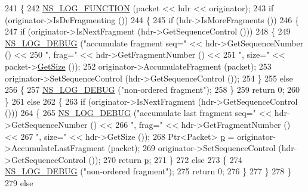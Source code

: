 \begin{DoxyCode}
241 \{
242   \hyperlink{log-macros-disabled_8h_a90b90d5bad1f39cb1b64923ea94c0761}{NS\_LOG\_FUNCTION} (packet << hdr << originator);
243   \textcolor{keywordflow}{if} (originator->IsDeFragmenting ())
244     \{
245       \textcolor{keywordflow}{if} (hdr->IsMoreFragments ())
246         \{
247           \textcolor{keywordflow}{if} (originator->IsNextFragment (hdr->GetSequenceControl ()))
248             \{
249               \hyperlink{group__logging_ga413f1886406d49f59a6a0a89b77b4d0a}{NS\_LOG\_DEBUG} (\textcolor{stringliteral}{"accumulate fragment seq="} << hdr->GetSequenceNumber () <<
250                             \textcolor{stringliteral}{", frag="} << hdr->GetFragmentNumber () <<
251                             \textcolor{stringliteral}{", size="} << packet->\hyperlink{classns3_1_1Packet_a462855c9929954d4301a4edfe55f4f1c}{GetSize} ());
252               originator->AccumulateFragment (packet);
253               originator->SetSequenceControl (hdr->GetSequenceControl ());
254             \}
255           \textcolor{keywordflow}{else}
256             \{
257               \hyperlink{group__logging_ga413f1886406d49f59a6a0a89b77b4d0a}{NS\_LOG\_DEBUG} (\textcolor{stringliteral}{"non-ordered fragment"});
258             \}
259           \textcolor{keywordflow}{return} 0;
260         \}
261       \textcolor{keywordflow}{else}
262         \{
263           \textcolor{keywordflow}{if} (originator->IsNextFragment (hdr->GetSequenceControl ()))
264             \{
265               \hyperlink{group__logging_ga413f1886406d49f59a6a0a89b77b4d0a}{NS\_LOG\_DEBUG} (\textcolor{stringliteral}{"accumulate last fragment seq="} << hdr->GetSequenceNumber () <<
266                             \textcolor{stringliteral}{", frag="} << hdr->GetFragmentNumber () <<
267                             \textcolor{stringliteral}{", size="} << hdr->GetSize ());
268               Ptr<Packet> \hyperlink{lte__link__budget_8m_ac9de518908a968428863f829398a4e62}{p} = originator->AccumulateLastFragment (packet);
269               originator->SetSequenceControl (hdr->GetSequenceControl ());
270               \textcolor{keywordflow}{return} \hyperlink{lte__link__budget_8m_ac9de518908a968428863f829398a4e62}{p};
271             \}
272           \textcolor{keywordflow}{else}
273             \{
274               \hyperlink{group__logging_ga413f1886406d49f59a6a0a89b77b4d0a}{NS\_LOG\_DEBUG} (\textcolor{stringliteral}{"non-ordered fragment"});
275               \textcolor{keywordflow}{return} 0;
276             \}
277         \}
278     \}
279   \textcolor{keywordflow}{else}

\end{DoxyCode}
